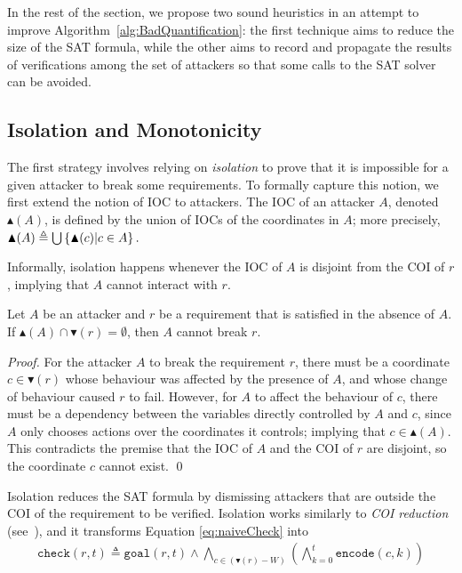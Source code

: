 {In the rest of the section, we propose two sound heuristics in an attempt to improve Algorithm~\ref{alg:BadQuantification}: the first technique aims to reduce the size of the SAT formula, while the other aims to record and propagate the results of verifications among the set of attackers so that some calls to the SAT solver can be avoided.

\subsection{Isolation and Monotonicity}
The first strategy involves relying on \emph{isolation} to prove that it is impossible for a given attacker to break some requirements. To formally capture this notion, we first extend the notion of IOC to attackers. The IOC of an attacker $A$, denoted $\blacktriangle(A)$, is defined by the union of IOCs of the coordinates in $A$; more precisely, $\blacktriangle(A) \triangleq \bigcup\left\{\blacktriangle(c)|c \in A\right\}.$

Informally, isolation happens whenever the IOC of $A$ is disjoint from the COI of $r$, implying that $A$ cannot interact with $r$.
\begin{proposition}[Isolation]
\label{theo:isolation}
Let $A$ be an attacker and $r$ be a requirement that is satisfied in the absence of $A$. If $\blacktriangle(A)\cap \blacktriangledown(r)=\emptyset$, then $A$ cannot break $r$.\end{proposition}
\begin{proof}

For the attacker $A$ to break the requirement $r$, there must be a coordinate $c \in \blacktriangledown(r)$ whose behaviour was affected by the presence of $A$, and whose change of behaviour caused $r$ to fail. However, for $A$ to affect the behaviour of $c$, there must be a dependency between the variables directly controlled by $A$ and $c$, since $A$ only chooses actions over the coordinates it controls; implying that $c\in \blacktriangle(A)$. This contradicts the premise that the IOC of $A$ and the COI of $r$ are disjoint, so the coordinate $c$ cannot exist. \qed
\end{proof}
Isolation reduces the SAT formula by dismissing attackers that are outside the COI of the requirement to be verified. Isolation works similarly to \emph{COI reduction} (see~\cite{ToSplitOrToGroup,GraphLabelingForEfficientCOIComputation,HandbookOfSatisfiability,HandbookOfModelChecking,OptimizedModelCheckingOfMultipleProperties}), and it transforms Equation \ref{eq:naiveCheck} into
\begin{align}
\label{eq:isolation}
\mathtt{check}(r,t)\triangleq\mathtt{goal}(r,t)\land\! \bigwedge_{c\in (\blacktriangledown(r)- W)}\left( \bigwedge_{k=0}^{t}{\mathtt{encode}(c,k)}\right)
\end{align}

}
